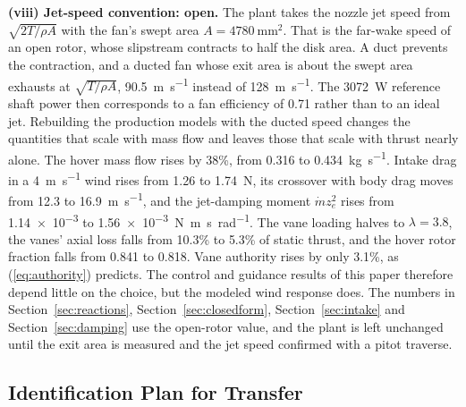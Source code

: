 \documentclass[journal]{IEEEtran}
\newcommand{\refeq}[1]{(\ref{#1})}
\newcommand{\refsec}[1]{Section~\ref{#1}}
\newcommand{\mdot}{\dot{m}}
\begin{document}
\textbf{(viii) Jet-speed convention: open.}
The plant takes the nozzle jet speed from $\sqrt{2T/\rho A}$ with the fan's swept area $A = \SI{4780}{\milli\metre\squared}$.
That is the far-wake speed of an open rotor, whose slipstream contracts to half the disk area.
A duct prevents the contraction, and a ducted fan whose exit area is about the swept area exhausts at $\sqrt{T/\rho A}$, \SI{90.5}{\metre\per\second} instead of \SI{128}{\metre\per\second}.
The \SI{3072}{\watt} reference shaft power then corresponds to a fan efficiency of 0.71 rather than to an ideal jet.
Rebuilding the production models with the ducted speed changes the quantities that scale with mass flow and leaves those that scale with thrust nearly alone.
The hover mass flow rises by 38\%, from 0.316 to \SI{0.434}{\kilogram\per\second}.
Intake drag in a \SI{4}{\metre\per\second} wind rises from 1.26 to \SI{1.74}{\newton}, its crossover with body drag moves from 12.3 to \SI{16.9}{\metre\per\second}, and the jet-damping moment $\mdot z_e^2$ rises from \num{1.14e-3} to \SI{1.56e-3}{\newton\metre\second\per\radian}.
The vane loading halves to $\lambda = 3.8$, the vanes' axial loss falls from 10.3\% to 5.3\% of static thrust, and the hover rotor fraction falls from 0.841 to 0.818.
Vane authority rises by only 3.1\%, as \refeq{eq:authority} predicts.
The control and guidance results of this paper therefore depend little on the choice, but the modeled wind response does.
The numbers in \refsec{sec:reactions}, \refsec{sec:closedform}, \refsec{sec:intake} and \refsec{sec:damping} use the open-rotor value, and the plant is left unchanged until the exit area is measured and the jet speed confirmed with a pitot traverse.

\subsection{Identification Plan for Transfer}
\end{document}

